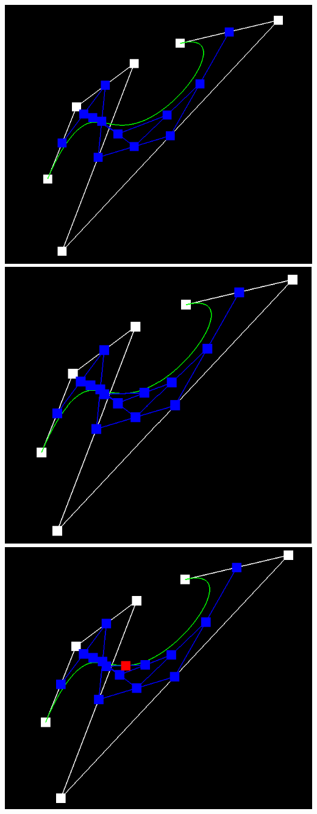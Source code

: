 \documentclass{article}
\begin{document}
\begin{center}
    \includegraphics[]{Part 1/step4.png}
    \includegraphics[]{Part 1/step5.png}
    \includegraphics[]{Part 1/step6.png}
\end{center}
\end{document}
